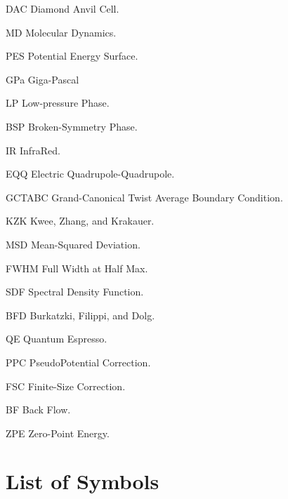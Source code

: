 \begin{symbollist*}
\item[DAC] Diamond Anvil Cell.
\item[MD] Molecular Dynamics.
\item[PES] Potential Energy Surface.
\item[GPa] Giga-Pascal
\item[LP] Low-pressure Phase.
\item[BSP] Broken-Symmetry Phase.
\item[IR] InfraRed.
\item[EQQ] Electric Quadrupole-Quadrupole.
\item[GCTABC] Grand-Canonical Twist Average Boundary Condition.
\item[KZK] Kwee, Zhang, and Krakauer.
\item[MSD] Mean-Squared Deviation.
\item[FWHM] Full Width at Half Max.
\item[SDF] Spectral Density Function.
\item[BFD] Burkatzki, Filippi, and Dolg.
\item[QE] Quantum Espresso.
\item[PPC] PseudoPotential Correction.
\item[FSC] Finite-Size Correction.
\item[BF] Back Flow.
\item[ZPE] Zero-Point Energy.
\end{symbollist*}

\chapter{List of Symbols}

